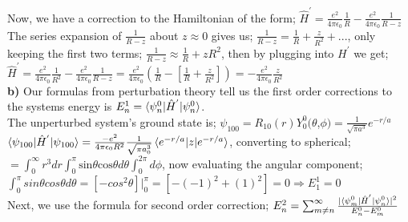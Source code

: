 \documentclass[12pt]{article}
\begin{document}
Now, we have a correction to the Hamiltonian of the form; $\hat{H}^{'}=\frac{e^2}{4\pi\epsilon_0}\frac{1}{R}-\frac{e^2}{4\pi\epsilon_0}\frac{1}{R-z}$\\

The series expansion of $\frac{1}{R-z}$ about $z\approx0$ gives us; $\frac{1}{R-z}=\frac{1}{R}+\frac{z}{R^2}+...$, only keeping the first two terms; $\frac{1}{R-z}\approx\frac{1}{R}+{z}{R^2}$, then by plugging into $H^{'}$ we get;\\

$\hat{H}^{'}=\frac{e^2}{4\pi\epsilon_0}\frac{1}{R^2}-\frac{e^2}{4\pi\epsilon_0}\frac{1}{R-z}=\frac{e^2}{4\pi\epsilon_0}(\frac{1}{R}-[\frac{1}{R}+\frac{z}{R^2}])=-\frac{e^2}{4\pi\epsilon_0}\frac{z}{R^2}$\\

\textbf{b) } Our formulas from perturbation theory tell us the first order corrections to the systems energy is $E^1_n=\braket{\psi^0_n|\hat{H}^{'}|\psi_n^0}$.\\

The unperturbed system's ground state is; $\psi_{100}=R_{10}(r)Y^0_0(\theta$,$\phi)=\frac{1}{\sqrt{\pi a^3}}e^{-r/a}$\\ 


$\braket{\psi_{100}|\hat{H}^{'}|\psi_{100}}=\frac{-e^2}{4\pi\epsilon_0R^2}\frac{1}{\sqrt{\pi a_0^3}}\braket{e^{-r/a}|z|e^{-r/a}}$, converting to spherical;\\

$={\displaystyle\int_0^\infty}r^3dr{\displaystyle\int_0^{\pi}}\text{sin}\theta\text{cos}\theta d\theta{\displaystyle\int_0^{2\pi}}d\phi$, now evaluating the angular component;\\

${\displaystyle\int_0^\pi}sin\theta cos\theta d\theta=[-cos^2\theta]|_0^\pi=[-(-1)^2+(1)^2]=0\Rightarrow E_1^1=0$\\

Next, we use the formula for second order correction; $E_n^2=\sum_{m\neq n}^\infty\frac{|\braket{\psi^0_{m}|\hat{H}^{'}|\psi^0_n}|^2}{E_n^0-E_m^0}$\\
\end{document}

